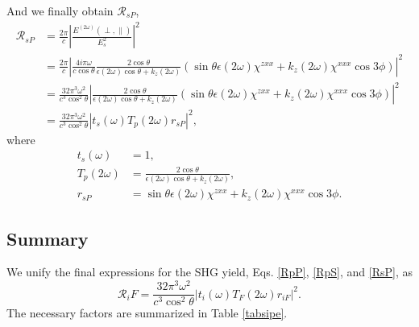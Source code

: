 \documentclass[10pt]{article}
\begin{document}
And we finally obtain $\mathcal{R}_{sP}$,
\begin{align}
\mathcal{R}_{sP}
&= \frac{2\pi}{c}
   \left\vert\frac{E^{(2\omega)}(\perp,\parallel)}{E^{2}_{s}}\right\vert^{2}
   \nonumber\\
&= \frac{2\pi}{c}
   \left\vert
   \frac{4i\pi\omega}{c\cos\theta}
   \frac{2\cos\theta}{\epsilon(2\omega)\cos\theta + k_{z}(2\omega)}
   (\sin\theta\epsilon(2\omega)\chi^{zxx} + k_{z}(2\omega)\chi^{xxx}\cos3\phi)
   \right\vert^{2}\nonumber\\
&= \frac{32\pi^{3}\omega^{2}}{c^{3}\cos^{2}\theta}
   \left\vert
   \frac{2\cos\theta}{\epsilon(2\omega)\cos\theta + k_{z}(2\omega)}
   (\sin\theta\epsilon(2\omega)\chi^{zxx} + k_{z}(2\omega)\chi^{xxx}\cos3\phi)
   \right\vert^{2}\nonumber\\
&= \frac{32\pi^{3}\omega^{2}}{c^{3}\cos^{2}\theta}
   \left\vert t_{s}(\omega)T_{p}(2\omega)r_{sP}\right\vert^{2},
   \label{RsP}
\end{align}
where
\begin{equation*}
\begin{split}
t_{s}(\omega)
&= 1,\\
T_{p}(2\omega)
&= \frac{2\cos\theta}{\epsilon(2\omega)\cos\theta + k_{z}(2\omega)},\\
r_{sP} &=
\sin\theta\epsilon(2\omega)\chi^{zxx} + k_{z}(2\omega)\chi^{xxx}\cos3\phi.
\end{split}
\end{equation*}


\subsection{Summary}

We unify the final expressions for the SHG yield, Eqs. \eqref{RpP},
\eqref{RpS}, and \eqref{RsP}, as
\begin{equation}\label{Rsipe}
\mathcal{R}_iF = \frac{32\pi^{3}\omega^{2}}{c^{3}\cos^{2}\theta}
\left\vert t_{i}(\omega)T_{F}(2\omega)r_{iF}\right\vert^{2}.
\end{equation}
The necessary factors are summarized in Table \ref{tabsipe}.
\end{document}
